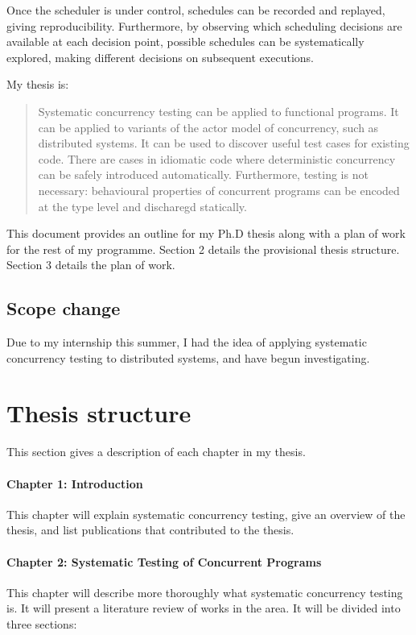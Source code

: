 \documentclass{article}
\begin{document}
Once the scheduler is under control, schedules can be recorded and
replayed, giving reproducibility. Furthermore, by observing which
scheduling decisions are available at each decision point, possible
schedules can be systematically explored, making different decisions
on subsequent executions.

My thesis is:

\begin{quote}
  Systematic concurrency testing can be applied to functional
  programs. It can be applied to variants of the actor model of
  concurrency, such as distributed systems. It can be used to discover
  useful test cases for existing code. There are cases in idiomatic
  code where deterministic concurrency can be safely introduced
  automatically. Furthermore, testing is not necessary: behavioural
  properties of concurrent programs can be encoded at the type level
  and discharegd statically.
\end{quote}

This document provides an outline for my Ph.D thesis along with a plan
of work for the rest of my programme. Section 2 details the
provisional thesis structure. Section 3 details the plan of work.

\subsection{Scope change}

Due to my internship this summer, I had the idea of applying
systematic concurrency testing to distributed systems, and have begun
investigating.

\section{Thesis structure}

This section gives a description of each chapter in my thesis.

\paragraph{Chapter 1: Introduction} This chapter will explain
systematic concurrency testing, give an overview of the thesis, and
list publications that contributed to the thesis.

\paragraph{Chapter 2: Systematic Testing of Concurrent Programs} This
chapter will describe more thoroughly what systematic concurrency
testing is. It will present a literature review of works in the
area. It will be divided into three sections:
\end{document}
